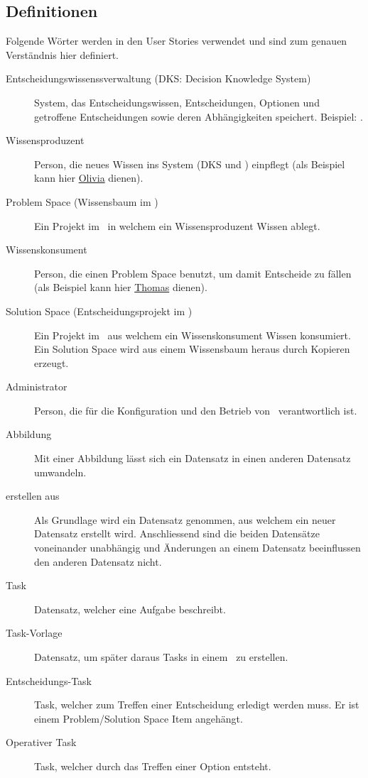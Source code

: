 	\subsection{Definitionen}\label{userstoryDefinitions}
		Folgende Wörter werden in den User Stories verwendet und sind zum genauen Verständnis hier definiert.
		\begin{description}			
			\item[Entscheidungswissenssverwaltung (DKS: Decision Knowledge System)] System, 
				das Entscheidungswissen, Entscheidungen, Optionen und getroffene Entscheidungen 
				sowie deren Abhängigkeiten speichert. Beispiel: \cdar.
			\item[Wissensproduzent] Person, die neues Wissen ins System (DKS und \eeppi)
				 einpflegt (als Beispiel kann hier \hyperref[olivia]{Olivia} dienen).
			\item[Problem Space (Wissensbaum im \cdar)] Ein Projekt im \cdar\, 
				in welchem ein Wissensproduzent Wissen ablegt.
			\item[Wissenskonsument] Person, die einen Problem Space benutzt,
				 um damit Entscheide zu fällen 
				 (als Beispiel kann hier \hyperref[thomas]{Thomas} dienen).
			\item[Solution Space (Entscheidungsprojekt im \cdar)] Ein Projekt im \cdar\, 
				aus welchem ein Wissenskonsument Wissen konsumiert.
				Ein Solution Space wird aus einem Wissensbaum heraus durch Kopieren erzeugt.
			\item[Administrator] Person, die für die Konfiguration 
				und den Betrieb von \eeppi\ verantwortlich ist.
			\item[Abbildung] Mit einer Abbildung lässt sich ein Datensatz 
				in einen anderen Datensatz umwandeln.
			\item[erstellen aus] Als Grundlage wird ein Datensatz genommen, 
				aus welchem ein neuer Datensatz erstellt wird.
				Anschliessend sind die beiden Datensätze voneinander unabhängig 
				und Änderungen an einem Datensatz beeinflussen den anderen Datensatz nicht.
			\item[Task] Datensatz, welcher eine Aufgabe beschreibt.
			\item[Task-Vorlage] Datensatz, um später daraus Tasks in einem \ppt\ zu erstellen.
			\item[Entscheidungs-Task] Task, 
				welcher zum Treffen einer Entscheidung erledigt werden muss.
				Er ist einem Problem/Solution Space Item angehängt.
			\item[Operativer Task] Task, welcher durch das Treffen einer Option entsteht.

\end{description}
